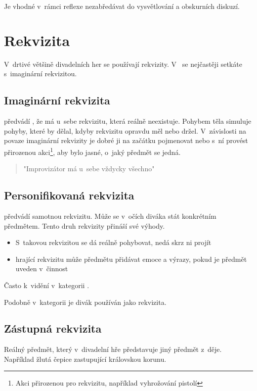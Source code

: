 Je vhodné v~rámci reflexe nezabředávat do vysvětlování a obskurních diskuzí.    
    
 
\needspace{5cm} \section{Rekvizita} \label{rekvizita} V~drtivé většině divadelních her se používají rekvizity. V~ se nejčastěji setkáte s~imaginární rekvizitou. 
 
 
\subsection{ Imaginární rekvizita }  předvádí , že má u~sebe rekvizitu, která reálně neexistuje. Pohybem těla simuluje pohyby, které by dělal, kdyby rekvizitu opravdu měl nebo držel. V~závislosti na povaze imaginární rekvizity je dobré ji na začátku pojmenovat nebo s~ní provést přirozenou akci\footnote{Akci přirozenou pro rekvizitu, například vyhrožování pistolí}, aby bylo jasné, o~jaký předmět se jedná. 
 
\begin{quote}"Improvizátor má u~sebe vždycky všechno"\end{quote} 
 
\subsection{ Personifikovaná rekvizita }  předvádí samotnou rekvizitu. Může se v~očích diváka stát konkrétním předmětem. Tento druh rekvizity přináší své výhody.  
 
\begin{itemize}
\item  S~takovou rekvizitou se dá reálně pohybovat, nedá skrz ni projít
\item  {} hrající rekvizitu může předmětu přidávat emoce a výrazy, pokud je předmět uveden v~činnost
\end{itemize}
 
Často k~vidění v~kategorii . 
 
Podobně v~kategorii  je divák používán jako rekvizita. 
 
\subsection{ Zástupná rekvizita } Reálný předmět, který v~divadelní hře představuje jiný předmět z~děje. Například žlutá čepice zastupující královskou korunu. 
 
